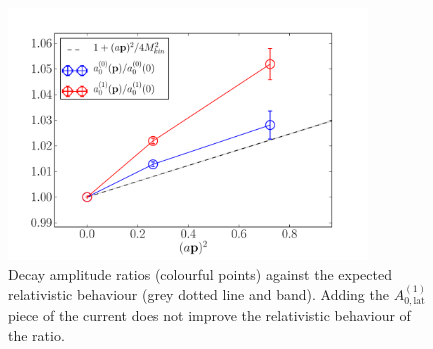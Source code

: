 \begin{figure}[htp!]
  \begin{center}
    \includegraphics[width=0.85\textwidth]{images/nrqcd/relativistic_normalization_J0J1.pdf}
  \end{center}
  \caption{Decay amplitude ratios (colourful points) against the expected relativistic behaviour (grey dotted line and band). Adding the $A_{0,\text{lat}}^{(1)}$ piece of the current does not improve the relativistic behaviour of the ratio. \label{fig:relativisticnorm}}
\end{figure}


